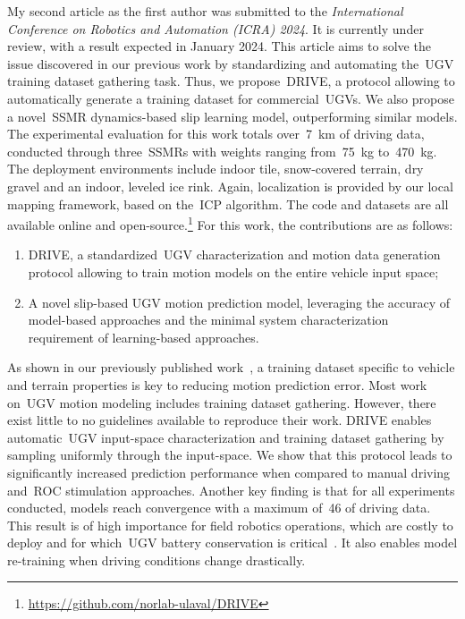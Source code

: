 \documentclass[12pt,letterpaper,oneside]{article}
\begin{document}
My second article as the first author was submitted to the \emph{International Conference on Robotics and Automation (ICRA) 2024}.
It is currently under review, with a result expected in January 2024.
This article aims to solve the issue discovered in our previous work by standardizing and automating the~\ac{UGV} training dataset gathering task.
Thus, we propose~\ac{DRIVE}, a protocol allowing to automatically generate a training dataset for commercial~\acp{UGV}.
We also propose a novel~\ac{SSMR} dynamics-based slip learning model, outperforming similar models.
The experimental evaluation for this work totals over~\SI{7}{\kilo\meter} of driving data, conducted through three~\acp{SSMR} with weights ranging from~\SI{75}{\kilo\gram} to~\SI{470}{\kilo\gram}.
The deployment environments include indoor tile, snow-covered terrain, dry gravel and an indoor, leveled ice rink.
Again, localization is provided by our local mapping framework, based on the~\ac{ICP} algorithm.
The code and datasets are all available online and open-source.\footnote{\url{https://github.com/norlab-ulaval/DRIVE}}
For this work, the contributions are as follows:
\begin{enumerate}
	\item \ac{DRIVE}, a standardized~\ac{UGV} characterization and motion data generation protocol allowing to train motion models on the entire vehicle input space;
	\item A novel slip-based \ac{UGV} motion prediction model, leveraging the accuracy of model-based approaches and the minimal system characterization requirement of learning-based approaches.
\end{enumerate}
As shown in our previously published work~\citep{Baril2020}, a training dataset specific to vehicle and terrain properties is key to reducing motion prediction error.
Most work on~\ac{UGV} motion modeling includes training dataset gathering.
However, there exist little to no guidelines available to reproduce their work.
\ac{DRIVE} enables automatic~\ac{UGV} input-space characterization and training dataset gathering by sampling uniformly through the input-space.
We show that this protocol leads to significantly increased prediction performance when compared to manual driving and~\acf{ROC} stimulation approaches.
Another key finding is that for all experiments conducted, models reach convergence with a maximum of~\SI{46}{\sec} of driving data.
This result is of high importance for field robotics operations, which are costly to deploy and for which~\ac{UGV} battery conservation is critical~\citep{Baril2022}.
It also enables model re-training when driving conditions change drastically.
\end{document}
